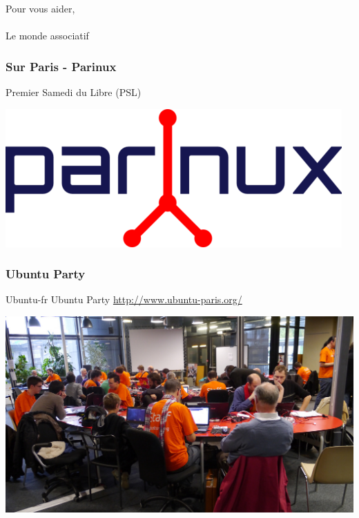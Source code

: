 \documentclass{beamer}
\begin{document}
\begin{frame}
\begin{center}
\Huge{Pour vous aider, \\~\\Le monde associatif}
\end{center}
\end{frame}

\begin{frame}
\frametitle{Sur Paris - Parinux}

\begin{block}{Premier Samedi du Libre (PSL)}
\end{block}
\begin{center}
\includegraphics[scale=0.5] {./images/parinux.png}
\end{center} 
\end{frame}
\begin{frame}
\frametitle{Ubuntu Party}
\begin{block}{Ubuntu-fr}
Ubuntu Party
\url{http://www.ubuntu-paris.org/}
\end{block}
\begin{center}
\includegraphics[scale=0.3] {./images/ubuntu-paris.jpg}
\end{center} 
\end{frame}
\end{document}
